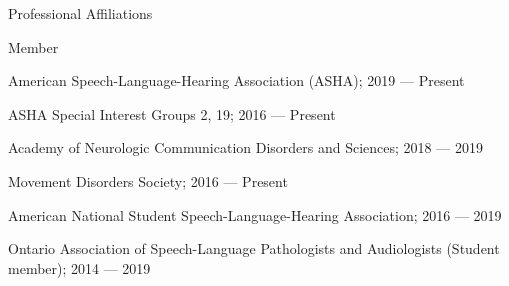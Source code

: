 \documentclass{resume} %
\begin{document}
\begin{rSection}{Professional Affiliations}
\begin{rSubsection}{Member}{}{}{}
	\item American Speech-Language-Hearing Association (ASHA); 2019 --- Present
	\item ASHA Special Interest Groups 2, 19; 2016 --- Present
	\item Academy of Neurologic Communication Disorders and Sciences; 2018 --- 2019
	\item Movement Disorders Society; 2016 --- Present
	\item American National Student Speech-Language-Hearing Association; 2016 --- 2019
	\item Ontario Association of Speech-Language Pathologists and Audiologists (Student member); 2014 --- 2019
\end{rSubsection}


\end{rSection}
\end{document}
